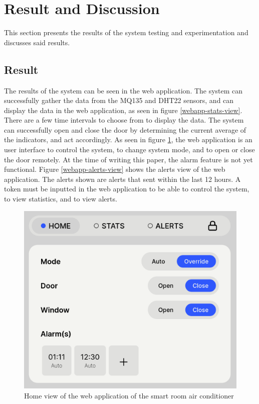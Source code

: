 \section{Result and Discussion}
This section presents the results of the system testing and experimentation and
discusses said results.

\subsection{Result}
The results of the system can be seen in the web
application. The system can successfully gather the data from the
MQ135 and DHT22 sensors, and can display the data in
the web application, as seen in figure \ref{webapp-stats-view}.
There are a few time intervals to choose from to display the data.
The system can successfully open and close the door by
determining the current average of the indicators,
and act accordingly. As seen in figure \ref{webapp-home-view},
the web application is an user interface to control the system,
to change system mode, and to open or close the door remotely.
At the time of writing this paper, the alarm feature is not yet functional.
Figure \ref{webapp-alerts-view} shows the alerts view of the web application.
The alerts shown are alerts that sent within the last 12 hours.
A token must be inputted in the web application to be able to control the system,
to view statistics, and to view alerts.

\begin{figure}
      \centerline{\includegraphics[scale=0.2]{resources/webapp-home-view.png}}
      \caption{Home view of the web application of the smart room air conditioner}
      \label{webapp-home-view}
\end{figure}

